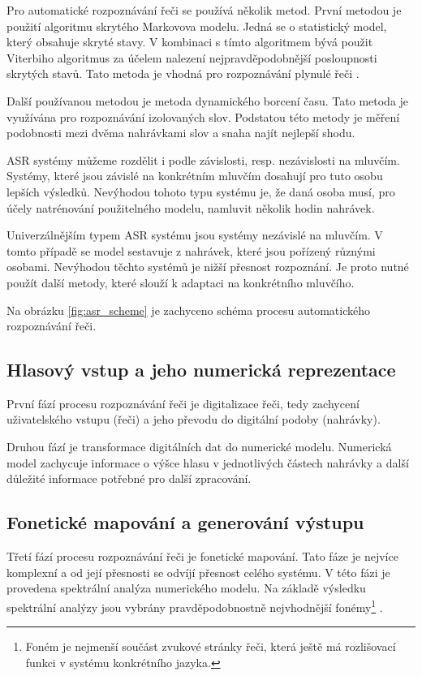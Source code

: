 \documentclass[ing,male,java,dept460]{diploma}						%
\begin{document}
Pro automatické rozpoznávání řeči se používá několik metod. První metodou je použití algoritmu skrytého Markovova modelu. Jedná se o statistický model, který obsahuje skryté stavy. V kombinaci s tímto algoritmem bývá použit Viterbiho algoritmus za účelem nalezení nejpravděpodobnější posloupnosti skrytých stavů. Tato metoda je vhodná pro rozpoznávání plynulé řeči \cite{asr_wiki}.

Další používanou metodou je metoda dynamického borcení času. Tato metoda je využívána pro rozpoznávání izolovaných slov. Podstatou této metody je měření podobnosti mezi dvěma nahrávkami slov a snaha najít nejlepší shodu.

ASR systémy můžeme rozdělit i podle závislosti, resp. nezávislosti na mluvčím. Systémy, které jsou závislé na konkrétním mluvčím dosahují pro tuto osobu lepších výsledků. Nevýhodou tohoto typu systému je, že daná osoba musí, pro účely natrénování použitelného modelu, namluvit několik hodin nahrávek.

Univerzálnějším typem ASR systému jsou systémy nezávislé na mluvčím. V tomto případě se model sestavuje z nahrávek, které jsou pořízený různými osobami. Nevýhodou těchto systémů je nižší přesnost rozpoznání. Je proto nutné použít další metody, které slouží k adaptaci na konkrétního mluvčího.

Na obrázku \ref{fig:asr_scheme} je zachyceno schéma procesu automatického rozpoznávání řeči.


\subsection{Hlasový vstup a jeho numerická reprezentace}
První fází procesu rozpoznávání řeči je digitalizace řeči, tedy zachycení uživatelského vstupu (řeči) a jeho převodu do digitální podoby (nahrávky).

Druhou fází je transformace digitálních dat do numerické modelu. Numerická model zachycuje informace o výšce hlasu v jednotlivých částech nahrávky a další důležité informace potřebné pro další zpracování.

\subsection{Fonetické mapování a generování výstupu}
Třetí fází procesu rozpoznávání řeči je fonetické mapování. Tato fáze je nejvíce komplexní a od její přesnosti se odvíjí přesnost celého systému. V této fázi je provedena spektrální analýza numerického modelu. Na základě výsledku spektrální analýzy jsou vybrány pravděpodobnostně nejvhodnější fonémy\footnote{Foném je nejmenší součást zvukové stránky řeči, která ještě má rozlišovací funkci v systému konkrétního jazyka.} \cite{vxmldevguide}.
\end{document}
